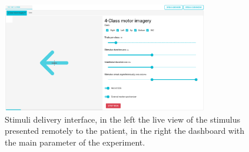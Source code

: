\begin{figure}
\begin{centering}
% 
\includegraphics[width=0.8\textwidth]{Cap4/Figures/stimuli_delivery.png}
\par\end{centering}
\caption[Stimuli delivery interface]{Stimuli delivery interface, in the left the live view of the stimulus presented remotely to the patient, in the right the dashboard with the main parameter of the experiment.}
\label{fig:stimuli_delivery_interface}
\end{figure}